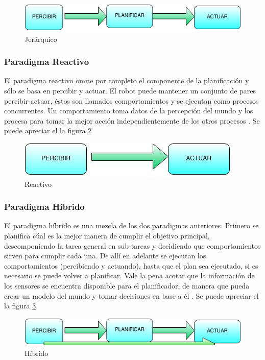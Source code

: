 \begin{figure}[hbtp]

\centering
\includegraphics[scale=0.7]{imagenes/jerarquico.png} 
\caption{Jer\'arquico}
\label{fig:jerarquico}
\end{figure}


\subsubsection{Paradigma Reactivo}
El paradigma reactivo omite por completo el componente de la planificación y s\'olo se basa en percibir y actuar. El robot puede mantener un conjunto de pares percibir-actuar, \'estos son llamados comportamientos y se ejecutan como procesos concurrentes. Un comportamiento toma datos de la percepción del mundo y los procesa para tomar la mejor acción independientemente de los otros procesos \cite{AiRobotics}.
Se puede apreciar el la figura \ref{fig:reactivo}
\begin{figure}[hbtp]

\centering
\includegraphics[scale=0.7]{imagenes/reactivo.jpg} 
\caption{Reactivo}
\label{fig:reactivo}
\end{figure}


\subsubsection{Paradigma Híbrido}
El paradigma híbrido es una mezcla de los dos paradigmas anteriores. Primero se planifica cúal es la mejor manera de cumplir el objetivo principal, descomponiendo la tarea general en sub-tareas y decidiendo que comportamientos sirven para cumplir cada una. De allí en adelante se ejecutan los comportamientos (percibiendo y actuando), hasta que el plan sea ejecutado, si es necesario se puede volver a planificar. Vale la pena acotar que la información de los sensores se encuentra disponible para el planificador, de manera que pueda crear un modelo del mundo y tomar decisiones en base a él  \cite{AiRobotics}. 
Se puede apreciar el la figura \ref{fig:hibrido}
\begin{figure}[hbtp]

\centering
\includegraphics[scale=0.7]{imagenes/hibrido.png} 
\caption{H\'ibrido}
\label{fig:hibrido}
\end{figure}
